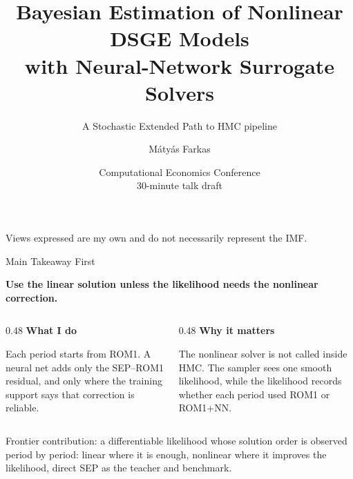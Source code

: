 \documentclass[aspectratio=169,10pt]{beamer}
\title[SEP--NN DSGE Estimation]{Bayesian Estimation of Nonlinear DSGE Models\\with Neural-Network Surrogate Solvers}
\subtitle{A Stochastic Extended Path to HMC pipeline}
\author[M. Farkas]{M\'aty\'as Farkas}
\institute[IMF]{International Monetary Fund}
\date{Computational Economics Conference \\ 30-minute talk draft}
\newcommand{\smallnote}[1]{%
  \vspace{0.25em}
  \begin{center}
  \parbox{0.92\linewidth}{\centering\footnotesize #1}
  \end{center}
}
\newcommand{\claim}[1]{%
  \begin{center}
  \parbox{0.94\linewidth}{\centering\large\bfseries #1}
  \end{center}
}
\newcommand{\softline}{\par\vspace{0.12em}\noindent{\color{DeepBlue!45}\rule{0.88\linewidth}{0.45pt}}\par\vspace{0.25em}}
\begin{document}
\begin{frame}
  \titlepage
  \vspace{-0.5em}
  \begin{center}
  \footnotesize Views expressed are my own and do not necessarily represent the IMF.
  \end{center}
\end{frame}

\begin{frame}{Main Takeaway First}
\claim{Use the linear solution unless the likelihood needs the nonlinear correction.}

\vspace{1.1em}
\begin{columns}[T,onlytextwidth]
\begin{column}{0.48\textwidth}
\textbf{What I do}

\softline
Each period starts from ROM1. A neural net adds only the SEP--ROM1 residual,
and only where the training support says that correction is reliable.
\end{column}
\begin{column}{0.48\textwidth}
\textbf{Why it matters}

\softline
The nonlinear solver is not called inside HMC. The sampler sees one smooth
likelihood, while the likelihood records whether each period used ROM1 or ROM1+NN.
\end{column}
\end{columns}

\smallnote{Frontier contribution: a differentiable likelihood whose solution order is observed period by period: linear where it is enough, nonlinear where it improves the likelihood, direct SEP as the teacher and benchmark.}
\end{frame}
\end{document}
